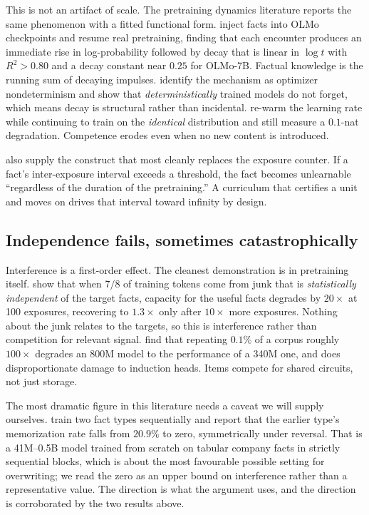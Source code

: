 \documentclass[11pt]{article}
\theoremstyle{plain}
\theoremstyle{definition}
\theoremstyle{remark}
\begin{document}
This is not an artifact of scale. The pretraining dynamics literature reports the
same phenomenon with a fitted functional form. \citet{chang2024acquire} inject
facts into OLMo checkpoints and resume real pretraining, finding that each
encounter produces an immediate rise in log-probability followed by decay that is
linear in $\log t$ with $R^2 > 0.80$ and a decay constant near $0.25$ for
OLMo-7B. Factual knowledge is the running sum of decaying impulses.
\citet{jagielski2023forgetting} identify the mechanism as
optimizer nondeterminism and show that \emph{deterministically} trained models do
not forget, which means decay is structural rather than incidental.
\citet{ibrahim2024simple} re-warm the learning rate while continuing
to train on the \emph{identical} distribution and still measure a $0.1$-nat
degradation. Competence erodes even when no new content is introduced.

\citet{chang2024acquire} also supply the construct that most cleanly replaces the
exposure counter. If a fact's inter-exposure interval exceeds a threshold, the
fact becomes unlearnable ``regardless of the duration of the pretraining.'' A
curriculum that certifies a unit and moves on drives that interval toward
infinity by design.

\subsection{Independence fails, sometimes catastrophically}

Interference is a first-order effect. The cleanest demonstration is in
pretraining itself. \citet{allenzhu2025capacity} show that when $7/8$ of training
tokens come from junk that is \emph{statistically independent} of the target
facts, capacity for the useful facts degrades by $20\times$ at 100 exposures,
recovering to $1.3\times$ only after $10\times$ more exposures. Nothing about the
junk relates to the targets, so this is interference rather than competition for
relevant signal. \citet{hernandez2022repeated} find that repeating $0.1\%$ of a
corpus roughly $100\times$ degrades an 800M model to the performance of a 340M
one, and does disproportionate damage to induction heads. Items compete for
shared circuits, not just storage.

The most dramatic figure in this literature needs a caveat we will supply
ourselves. \citet{lu2024factmemorization} train two fact types sequentially and
report that the earlier type's memorization rate falls from $20.9\%$ to zero,
symmetrically under reversal. That is a 41M--0.5B model trained from scratch on
tabular company facts in strictly sequential blocks, which is about the most
favourable possible setting for overwriting; we read the zero as an upper bound
on interference rather than a representative value. The direction is what the
argument uses, and the direction is corroborated by the two results above.
\end{document}
